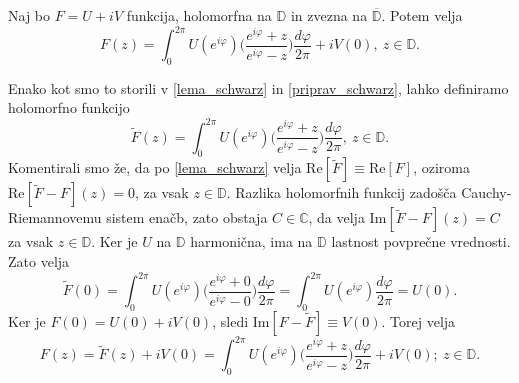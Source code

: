 \documentclass[mat1, tisk]{fmfdelo}
\begin{document}
    \begin{trditev}
        \label{schwarz_int_f}
        Naj bo $F = U + iV$ funkcija, holomorfna na $\mathbb{D}$ in zvezna na $\overline{\mathbb{D}}$. Potem velja
        $$ 
            F(z) = \int_{0}^{2 \pi}{U(e^{i \varphi})\bigg(\frac{e^{i\varphi}+z}{e^{i\varphi}-z}\bigg)\frac{d \varphi}{2 \pi}} + i V(0),~z \in \mathbb{D}.
        $$
    \end{trditev}
    \begin{dokaz}
        Enako kot smo to storili v \eqref{lema_schwarz} in \eqref{priprav_schwarz}, lahko definiramo holomorfno funkcijo
        $$
        \widetilde{F}(z) = \int_{0}^{2 \pi}{U(e^{i \varphi})\bigg(\frac{e^{i\varphi}+z}{e^{i\varphi}-z}\bigg)\frac{d \varphi}{2 \pi}},~z \in \mathbb{D}.
        $$
        Komentirali smo že, da po \eqref{lema_schwarz} velja $\text{Re}[\widetilde{F}] \equiv \text{Re}[F]$, oziroma $\text{Re}[\widetilde{F} - F](z) = 0$, za vsak $z \in \mathbb{D}$. Razlika holomorfnih funkcij zadošča Cauchy-Riemannovemu sistem enačb, zato obstaja $C \in \mathbb{C}$, da velja $\text{Im}[\widetilde{F} - F](z) = C$ za vsak $z \in \mathbb{D}$.
        Ker je $U$ na $\mathbb{D}$ harmonična, ima na $\mathbb{D}$ lastnost povprečne vrednosti. Zato velja
        $$
        \widetilde{F}(0) = \int_{0}^{2 \pi}{U(e^{i \varphi})\bigg(\frac{e^{i\varphi}+0}{e^{i\varphi}-0}\bigg)\frac{d \varphi}{2 \pi}} = \int_{0}^{2 \pi}{U(e^{i \varphi})\frac{d \varphi}{2 \pi}} = U(0).
        $$
        Ker je $F(0) = U(0) + iV(0)$, sledi $\text{Im}[F - \widetilde{F}] \equiv V(0)$.
        Torej velja
        $$ 
        F(z) = \widetilde{F}(z) + iV(0) = \int_{0}^{2 \pi}{U(e^{i \varphi})\bigg(\frac{e^{i\varphi}+z}{e^{i\varphi}-z}\bigg)\frac{d \varphi}{2 \pi}} + i V(0);~z \in \mathbb{D}.
        $$
    \end{dokaz}
\end{document}
